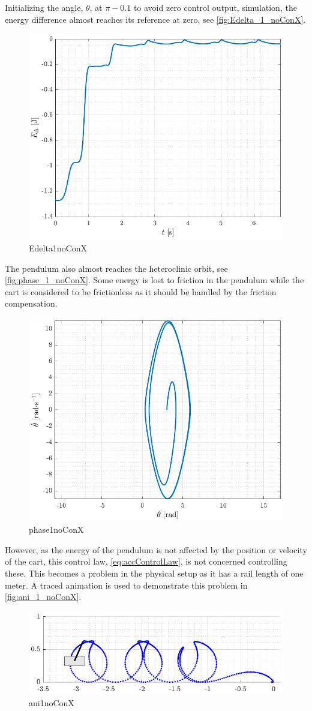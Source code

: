 Initializing the angle, $\theta$, at $\pi-0.1$ to avoid zero control output, simulation, the energy difference almost reaches its reference at zero, see \autoref{fig:Edelta_1_noConX}.
%
\begin{figure}[H]
  \includegraphics[width=.5\textwidth]{figures/Edelta_1_noConX}
  \caption{Edelta1noConX}
  \label{fig:Edelta_1_noConX}
\end{figure}
%
The pendulum also almost reaches the heteroclinic orbit, see \autoref{fig:phase_1_noConX}. 
Some energy is lost to friction in the pendulum while the cart is considered to be frictionless as it should be handled by the friction compensation.
\begin{figure}[H]
  \includegraphics[width=.5\textwidth]{figures/phase_1_noConX}
  \caption{phase1noConX}
  \label{fig:phase_1_noConX}
\end{figure}
%
However, as the energy of the pendulum is not affected by the position or velocity of the cart, this control law, \autoref{eq:accControlLaw}, is not concerned controlling these. This becomes a problem in the physical setup as it has a rail length of one meter. A traced animation is used to demonstrate this problem in \autoref{fig:ani_1_noConX}.
\begin{figure}[H]
  \includegraphics[width=.6\textwidth]{figures/ani_1_noConX}
  \caption{ani1noConX}
  \label{fig:ani_1_noConX}
\end{figure}

